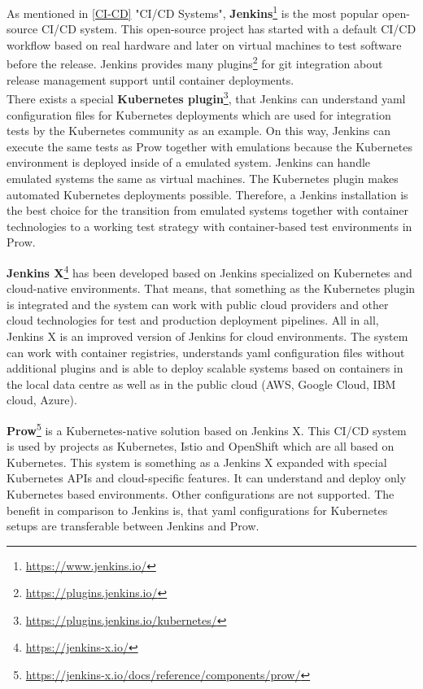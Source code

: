 As mentioned in \ref{CI-CD} "CI/CD Systems", \textbf{Jenkins}\footnote{\url{https://www.jenkins.io/}} is the most popular open-source \gls{CI/CD} system. This open-source project has started with a default \gls{CI/CD} workflow based on real hardware and later on virtual machines to test software before the release. Jenkins provides many plugins\footnote{\url{https://plugins.jenkins.io/}} for git integration about release management support until container deployments. \\
There exists a special \textbf{Kubernetes plugin}\footnote{\url{https://plugins.jenkins.io/kubernetes/}}, that Jenkins can understand yaml configuration files for Kubernetes deployments which are used for integration tests by the Kubernetes community as an example. On this way, Jenkins can execute the same tests as Prow together with emulations because the Kubernetes environment is deployed inside of a emulated system. Jenkins can handle emulated systems the same as virtual machines. The Kubernetes plugin makes automated Kubernetes deployments possible. Therefore, a Jenkins installation is the best choice for the transition from emulated systems together with container technologies to a working test strategy with container-based test environments in Prow.

\textbf{Jenkins X}\footnote{\url{https://jenkins-x.io/}} has been developed based on Jenkins specialized on Kubernetes and cloud-native environments. That means, that something as the Kubernetes plugin is integrated and the system can work with public cloud providers and other cloud technologies for test and production deployment pipelines. All in all, Jenkins X is an improved version of Jenkins for cloud environments. The system can work with container registries, understands yaml configuration files without additional plugins and is able to deploy scalable systems based on containers in the local data centre as well as in the public cloud (AWS, Google Cloud, IBM cloud, Azure).

\textbf{Prow}\footnote{\url{https://jenkins-x.io/docs/reference/components/prow/}} is a Kubernetes-native solution based on Jenkins X. This \gls{CI/CD} system is used by projects as Kubernetes, Istio and OpenShift which are all based on Kubernetes. This system is something as a Jenkins X expanded with special Kubernetes APIs and cloud-specific features. It can understand and deploy only Kubernetes based environments. Other configurations are not supported. The benefit in comparison to Jenkins is, that yaml configurations for Kubernetes setups are transferable between Jenkins and Prow.

